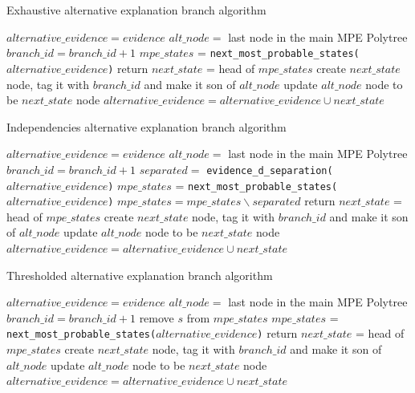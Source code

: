 \begin{algorithm}[htp!]
	\caption{Exhaustive alternative explanation branch algorithm}
	\label{alg:alternative-branch-echaustive}
	\begin{algorithmic}[1]
		\State $alternative\_evidence = evidence$ 
		\State $alt\_node = $ last node in the main MPE Polytree
		\State $branch\_id = branch\_id + 1$
			\State $mpe\_states$ = \texttt{next\_most\_probable\_states($alternative\_evidence$)}
				\State return
			\Else
				\State $next\_state$ = head of $mpe\_states$ 
				\State create $next\_state$ node, tag it with $branch\_id$ and make it son of $alt\_node$
				\State update $alt\_node$ node to be $next\_state$ node
				\State $alternative\_evidence = alternative\_evidence \cup next\_state$
			\EndIf
		\EndWhile
	\end{algorithmic}
\end{algorithm}

\begin{algorithm}[htp!]
	\caption{Independencies alternative explanation branch algorithm}
	\label{alg:alternative-branch-independencies}
	\begin{algorithmic}[1]
		\State $alternative\_evidence = evidence$ 
		\State $alt\_node = $ last node in the main MPE Polytree
		\State $branch\_id = branch\_id + 1$
			\State $separated = $ \texttt{evidence\_d\_separation($alternative\_evidence$)}
			\State $mpe\_states$ = \texttt{next\_most\_probable\_states($alternative\_evidence$)}
			\State $mpe\_states = mpe\_states \smallsetminus separated$ 
				\State return
			\Else
				\State $next\_state$ = head of $mpe\_states$ 
				\State create $next\_state$ node, tag it with $branch\_id$ and make it son of $alt\_node$
				\State update $alt\_node$ node to be $next\_state$ node
				\State $alternative\_evidence = alternative\_evidence \cup next\_state$
			\EndIf
		\EndWhile
	\end{algorithmic}
\end{algorithm} 

\begin{algorithm}[htp!]
	\caption{Thresholded alternative explanation branch algorithm}
	\label{alg:alternative-branch-thresholded}
	\begin{algorithmic}[1]
		\State $alternative\_evidence = evidence$ 
		\State $alt\_node = $ last node in the main MPE Polytree
		\State $branch\_id = branch\_id + 1$
					\State remove $s$ from $mpe\_states$ 
				\EndIf
			\EndFor	
			\State $mpe\_states$ = \texttt{next\_most\_probable\_states($alternative\_evidence$)}
				\State return
			\Else
				\State $next\_state$ = head of $mpe\_states$ 
				\State create $next\_state$ node, tag it with $branch\_id$ and make it son of $alt\_node$
				\State update $alt\_node$ node to be $next\_state$ node
				\State $alternative\_evidence = alternative\_evidence \cup next\_state$
			\EndIf
		\EndWhile
	\end{algorithmic}
\end{algorithm} 

